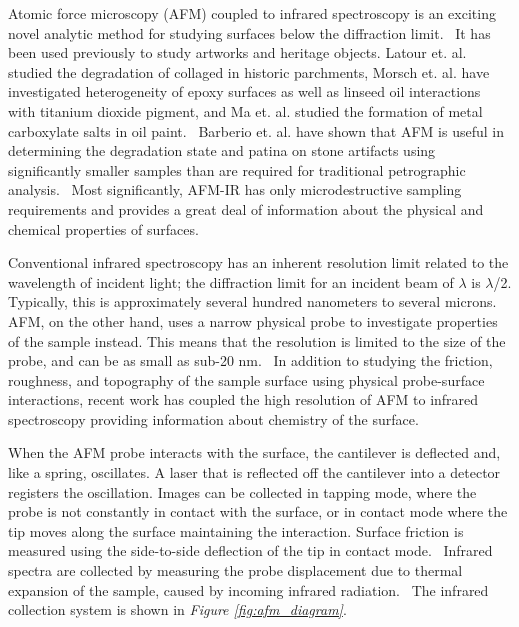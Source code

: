 Atomic force microscopy (AFM) coupled to infrared spectroscopy is an exciting novel analytic method for studying surfaces below the diffraction limit.~\autocite{dazzi2017,kurouski} It has been used previously to study artworks and heritage objects. Latour et. al. studied the degradation of collaged in historic parchments, Morsch et. al. have investigated heterogeneity of epoxy surfaces as well as linseed oil interactions with titanium dioxide pigment, and Ma et. al. studied the formation of metal carboxylate salts in oil paint.~\autocite{latour,Morsch,morsch2016,ma} Barberio et. al. have shown that AFM is useful in determining the degradation state and patina on stone artifacts using significantly smaller samples than are required for traditional petrographic analysis.~\autocite{Barberio} Most significantly, AFM-IR has only microdestructive sampling requirements and provides a great deal of information about the physical and chemical properties of surfaces.~\autocite{dazzi2017,kurouski}

Conventional infrared spectroscopy has an inherent resolution limit related to the wavelength of incident light; the diffraction limit for an incident beam of $\lambda$ is $\lambda$/2. Typically, this is approximately several hundred nanometers to several microns. AFM, on the other hand, uses a narrow physical probe to investigate properties of the sample instead. This means that the resolution is limited to the size of the probe, and can be as small as sub-20 nm.~\autocite{dazzi2017} In addition to studying the friction, roughness, and topography of the sample surface using physical probe-surface interactions, recent work has coupled the high resolution of AFM to infrared spectroscopy providing information about chemistry of the surface.~\autocite{dazzi2017,kurouski}

When the AFM probe interacts with the surface, the cantilever is deflected and, like a spring, oscillates. A laser that is reflected off the cantilever into a detector registers the oscillation. Images can be collected in tapping mode, where the probe is not constantly in contact with the surface, or in contact mode where the tip moves along the surface maintaining the interaction. Surface friction is measured using the side-to-side deflection of the tip in contact mode.~\autocite{friction_afm} Infrared spectra are collected by measuring the probe displacement due to thermal expansion of the sample, caused by incoming infrared radiation.~\autocite{dazzi2017,kurouski} The infrared collection system is shown in \textit{Figure \ref{fig:afm_diagram}}.

